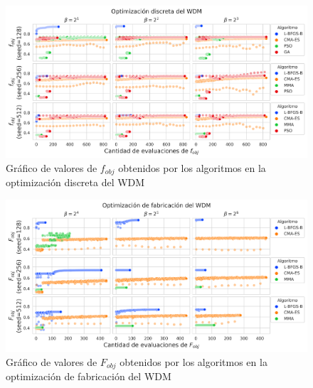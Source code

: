 \begin{landscape}
\begin{figure}[ht]
  \centering
  \includegraphics[scale=1.0]{image/results/wdm/wdm-opt-disc.png}
  \caption{Gráfico de valores de $f_{obj}$ obtenidos por los algoritmos en la optimización discreta del WDM}
  \label{fig:wdm-disc}
\end{figure}
\end{landscape}

\begin{landscape}
\begin{figure}[ht]
  \centering
  \includegraphics[scale=1.0]{image/results/wdm/wdm-opt-fab.png}
  \caption{Gráfico de valores de $F_{obj}$ obtenidos por los algoritmos en la optimización de fabricación del WDM}
  \label{fig:wdm-fab}
\end{figure}
\end{landscape}


